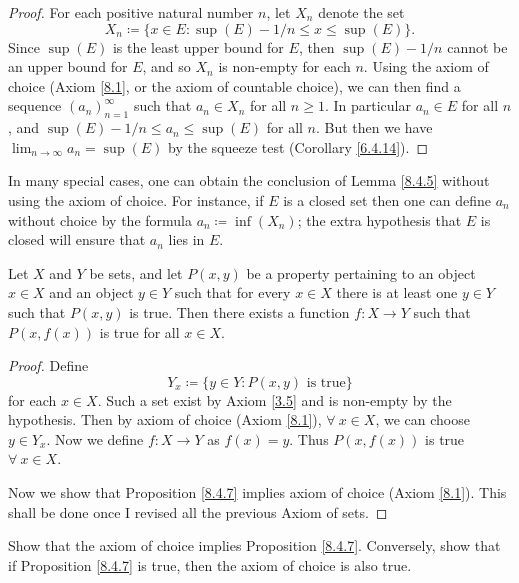 \begin{proof}
    For each positive natural number \(n\), let \(X_n\) denote the set
    \[
        X_n \coloneqq \{x \in E : \sup(E) - 1 / n \leq x \leq \sup(E)\}.
    \]
    Since \(\sup(E)\) is the least upper bound for \(E\), then \(\sup(E) - 1 / n\) cannot be an upper bound for \(E\), and so \(X_n\) is non-empty for each \(n\).
    Using the axiom of choice (Axiom \ref{8.1}, or the axiom of countable choice), we can then find a sequence \((a_n)_{n = 1}^\infty\) such that \(a_n \in X_n\) for all \(n \geq 1\).
    In particular \(a_n \in E\) for all \(n\), and \(\sup(E) - 1 / n \leq a_n \leq \sup(E)\) for all \(n\).
    But then we have \(\lim_{n \to \infty} a_n = \sup(E)\) by the squeeze test (Corollary \ref{6.4.14}).
\end{proof}

\begin{remark}\label{8.4.6}
    In many special cases, one can obtain the conclusion of Lemma \ref{8.4.5} without using the axiom of choice.
    For instance, if \(E\) is a closed set then one can define \(a_n\) without choice by the formula \(a_n \coloneqq \inf(X_n)\);
    the extra hypothesis that \(E\) is closed will ensure that \(a_n\) lies in \(E\).
\end{remark}

\begin{proposition}\label{8.4.7}
    Let \(X\) and \(Y\) be sets, and let \(P(x, y)\) be a property pertaining to an object \(x \in X\) and an object \(y \in Y\) such that for every \(x \in X\) there is at least one \(y \in Y\) such that \(P(x, y)\) is true.
    Then there exists a function \(f : X \to Y\) such that \(P(x, f(x))\) is true for all \(x \in X\).
\end{proposition}

\begin{proof}
    Define
    \[
        Y_x \coloneqq \{y \in Y : P(x, y) \text{ is true}\}
    \]
    for each \(x \in X\).
    Such a set exist by Axiom \ref{3.5} and is non-empty by the hypothesis.
    Then by axiom of choice (Axiom \ref{8.1}), \(\forall\ x \in X\), we can choose \(y \in Y_x\).
    Now we define \(f : X \to Y\) as \(f(x) = y\).
    Thus \(P(x, f(x))\) is true \(\forall\ x \in X\).

    Now we show that Proposition \ref{8.4.7} implies axiom of choice (Axiom \ref{8.1}).
    This shall be done once I revised all the previous Axiom of sets.
\end{proof}

\exercisesection

\begin{exercise}\label{ex 8.4.1}
    Show that the axiom of choice implies Proposition \ref{8.4.7}.
    Conversely, show that if Proposition \ref{8.4.7} is true, then the axiom of choice is also true.
\end{exercise}